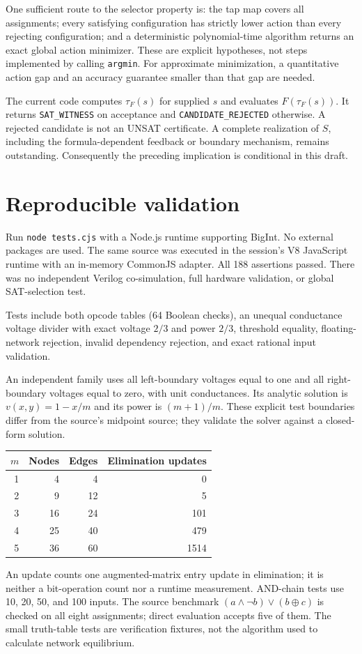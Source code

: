 \documentclass[11pt]{article}
\begin{document}
One sufficient route to the selector property is: the tap map covers
all assignments; every satisfying configuration has strictly lower
action than every rejecting configuration; and a deterministic
polynomial-time algorithm returns an exact global action minimizer.
These are explicit hypotheses, not steps implemented by calling
\texttt{argmin}. For approximate minimization, a quantitative action
gap and an accuracy guarantee smaller than that gap are needed.

The current code computes $\tau_F(s)$ for supplied $s$ and evaluates
$F(\tau_F(s))$. It returns \texttt{SAT\_WITNESS} on acceptance and
\texttt{CANDIDATE\_REJECTED} otherwise. A rejected candidate is not an
UNSAT certificate. A complete realization of $S$, including the
formula-dependent feedback or boundary mechanism, remains outstanding.
Consequently the preceding implication is conditional in this draft.

\section{Reproducible validation}
Run \texttt{node tests.cjs} with a Node.js runtime supporting BigInt.
No external packages are used. The same source was executed in the
session's V8 JavaScript runtime with an in-memory CommonJS adapter.
All 188 assertions passed. There was no independent Verilog
co-simulation, full hardware validation, or global SAT-selection test.

Tests include both opcode tables (64 Boolean checks), an unequal
conductance voltage divider with exact voltage $2/3$ and power $2/3$,
threshold equality, floating-network rejection, invalid dependency
rejection, and exact rational input validation.

An independent family uses all left-boundary voltages equal to one and
all right-boundary voltages equal to zero, with unit conductances.
Its analytic solution is $v(x,y)=1-x/m$ and its power is $(m+1)/m$.
These explicit test boundaries differ from the source's midpoint source;
they validate the solver against a closed-form solution.

\begin{center}
\begin{tabular}{rrrr}
\toprule
$m$ & Nodes & Edges & Elimination updates\\
\midrule
1 & 4 & 4 & 0\\
2 & 9 & 12 & 5\\
3 & 16 & 24 & 101\\
4 & 25 & 40 & 479\\
5 & 36 & 60 & 1514\\
\bottomrule
\end{tabular}
\end{center}
An update counts one augmented-matrix entry update in elimination;
it is neither a bit-operation count nor a runtime measurement.
AND-chain tests use 10, 20, 50, and 100 inputs.
The source benchmark $(a\land\neg b)\lor(b\oplus c)$ is checked on all
eight assignments; direct evaluation accepts five of them.
The small truth-table tests are verification fixtures, not the
algorithm used to calculate network equilibrium.
\end{document}
